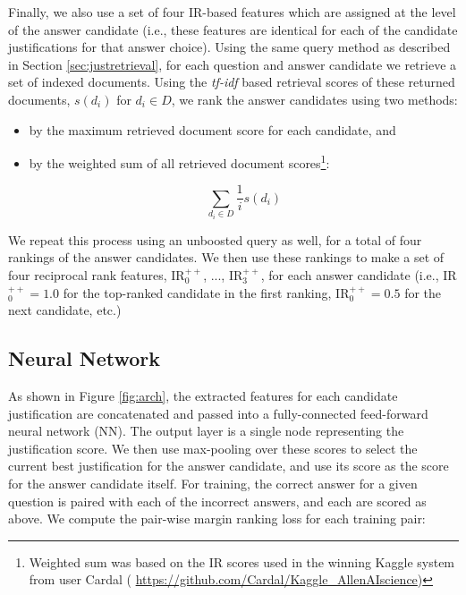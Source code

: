 {} 
Finally, we also use a set of four IR-based features which are assigned at the level of the answer candidate (i.e., these features are identical for each of the candidate justifications for that answer choice).   
Using the same query method as described in Section \ref{sec:justretrieval}, for each question and answer candidate we retrieve a set of indexed documents.
Using the \emph{tf-idf} based retrieval scores of these returned documents, 
$s(d_i)$ for $d_i \in D$, we rank the answer candidates using two methods: 
\begin{itemize}
\item by the maximum retrieved document score for each candidate, and  
\item by the weighted sum of all retrieved document scores\footnote{Weighted sum was based on the IR scores used in the winning Kaggle system from user Cardal (\scriptsize{ \url{https://github.com/Cardal/Kaggle_AllenAIscience}})}:

\begin{equation}
\sum_{d_i \in D} \dfrac{1}{i} s(d_i) 
\end{equation}

\end{itemize}
We repeat this process using an unboosted query as well, for a total of four rankings of the answer candidates.  
We then use these rankings to make a set of four reciprocal rank features,  IR$^{++}_0$, ..., IR$^{++}_3$, for each answer candidate (i.e., IR$^{++}_0 = 1.0$ for the top-ranked candidate in the first ranking,  IR$^{++}_0 = 0.5$ for the next candidate, etc.)
  


\subsection{Neural Network}
\label{sec:nn_model}

As shown in Figure \ref{fig:arch}, the extracted features for each candidate justification are concatenated and passed into a fully-connected feed-forward neural network (NN).  The output layer is a single node representing the justification score.  We then use max-pooling over these scores to select the current best justification for the answer candidate, and use its score as the score for the answer candidate itself.  For training, the correct answer for a given question is paired with each of the incorrect answers, and each are scored as above.  We compute the pair-wise margin ranking loss for each training pair:

